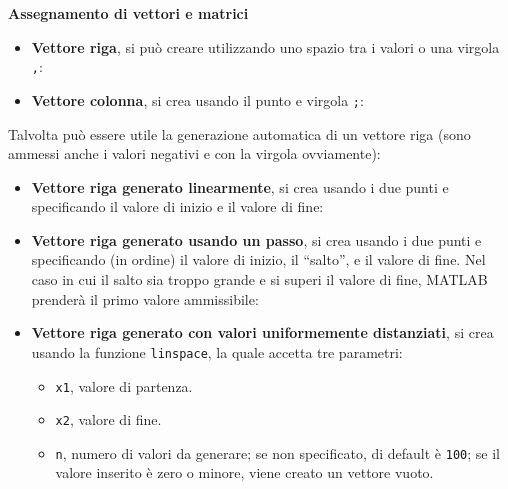 \documentclass[a4paper]{article}
\newcommand{\dquotes}[1]{``#1''}
\begin{document}
    \begin{flushleft}
        \large
        \textcolor{Red3}{\textbf{Assegnamento di vettori e matrici}}
    \end{flushleft}
    \begin{itemize}
        \item \textbf{Vettore riga}, si può creare utilizzando uno spazio tra i valori o una virgola \texttt{,}:
        

        \item \textbf{Vettore colonna}, si crea usando il punto e virgola \texttt{;}:
        
    \end{itemize}
    Talvolta può essere utile la generazione automatica di un vettore riga (sono ammessi anche i valori negativi e con la virgola ovviamente):
    \begin{itemize}
        \item \textbf{Vettore riga generato linearmente}, si crea usando i due punti e specificando il valore di inizio e il valore di fine:
        

        \item \textbf{Vettore riga generato usando un passo}, si crea usando i due punti e specificando (in ordine) il valore di inizio, il \dquotes{salto}, e il valore di fine. Nel caso in cui il salto sia troppo grande e si superi il valore di fine, MATLAB prenderà il primo valore ammissibile:
        

        \item \textbf{Vettore riga generato con valori uniformemente distanziati}, si crea usando la funzione \texttt{linspace}, la quale accetta tre parametri:
        \begin{itemize}
            \item \texttt{x1}, valore di partenza.
            \item \texttt{x2}, valore di fine.
            \item \texttt{n}, numero di valori da generare; se non specificato, di default è \texttt{100}; se il valore inserito è zero o minore, viene creato un vettore vuoto.
        \end{itemize}
        
    \end{itemize}
\end{document}
